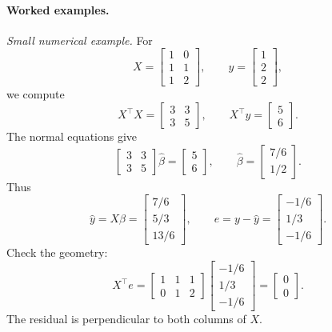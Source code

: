 \paragraph{Worked examples.}
\emph{Small numerical example.} For
\[
X=
\begin{bmatrix}
1&0\\
1&1\\
1&2
\end{bmatrix},
\qquad
y=
\begin{bmatrix}
1\\2\\2
\end{bmatrix},
\]
we compute
\[
X^\top X=
\begin{bmatrix}
3&3\\
3&5
\end{bmatrix},
\qquad
X^\top y=
\begin{bmatrix}
5\\6
\end{bmatrix}.
\]
The normal equations give
\[
\begin{bmatrix}
3&3\\
3&5
\end{bmatrix}
\hat\beta
=
\begin{bmatrix}
5\\6
\end{bmatrix},
\qquad
\hat\beta=
\begin{bmatrix}
7/6\\
1/2
\end{bmatrix}.
\]
Thus
\[
\hat y=X\hat\beta=
\begin{bmatrix}
7/6\\
5/3\\
13/6
\end{bmatrix},
\qquad
e=y-\hat y=
\begin{bmatrix}
-1/6\\
1/3\\
-1/6
\end{bmatrix}.
\]
Check the geometry:
\[
X^\top e=
\begin{bmatrix}
1&1&1\\
0&1&2
\end{bmatrix}
\begin{bmatrix}
-1/6\\
1/3\\
-1/6
\end{bmatrix}
=
\begin{bmatrix}
0\\0
\end{bmatrix}.
\]
The residual is perpendicular to both columns of \(X\).

